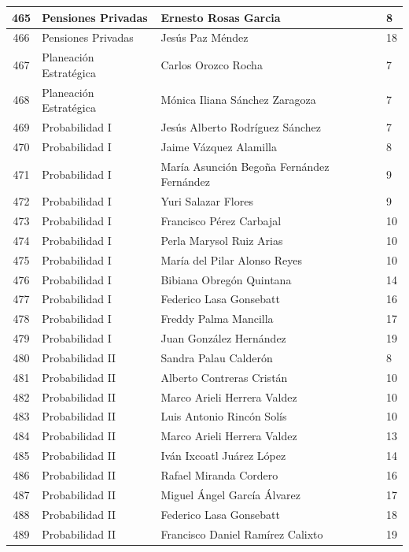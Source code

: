 {\begin{longtable}{|c|p{6.5cm}|p{5cm}|p{1.5cm}|}
465 & Pensiones Privadas & Ernesto Rosas Garcia & 8 \\ \hline
466 & Pensiones Privadas & Jesús Paz Méndez & 18 \\ \hline
467 & Planeación Estratégica & Carlos Orozco Rocha & 7 \\ \hline
468 & Planeación Estratégica & Mónica Iliana Sánchez Zaragoza & 7 \\ \hline
469 & Probabilidad I & Jesús Alberto Rodríguez Sánchez & 7 \\ \hline
470 & Probabilidad I & Jaime Vázquez Alamilla & 8 \\ \hline
471 & Probabilidad I & María Asunción Begoña Fernández Fernández & 9 \\ \hline
472 & Probabilidad I & Yuri Salazar Flores & 9 \\ \hline
473 & Probabilidad I & Francisco Pérez Carbajal & 10 \\ \hline
474 & Probabilidad I & Perla Marysol Ruiz Arias & 10 \\ \hline
475 & Probabilidad I & María del Pilar Alonso Reyes & 10 \\ \hline
476 & Probabilidad I & Bibiana Obregón Quintana & 14 \\ \hline
477 & Probabilidad I & Federico Lasa Gonsebatt & 16 \\ \hline
478 & Probabilidad I & Freddy Palma Mancilla & 17 \\ \hline
479 & Probabilidad I & Juan González Hernández & 19 \\ \hline
480 & Probabilidad II & Sandra Palau Calderón & 8 \\ \hline
481 & Probabilidad II & Alberto Contreras Cristán & 10 \\ \hline
482 & Probabilidad II & Marco Arieli Herrera Valdez & 10 \\ \hline
483 & Probabilidad II & Luis Antonio Rincón Solís & 10 \\ \hline
484 & Probabilidad II & Marco Arieli Herrera Valdez & 13 \\ \hline
485 & Probabilidad II & Iván Ixcoatl Juárez López & 14 \\ \hline
486 & Probabilidad II & Rafael Miranda Cordero & 16 \\ \hline
487 & Probabilidad II & Miguel Ángel García Álvarez & 17 \\ \hline
488 & Probabilidad II & Federico Lasa Gonsebatt & 18 \\ \hline
489 & Probabilidad II & Francisco Daniel Ramírez Calixto & 19 \\ \hline

\end{longtable}}

